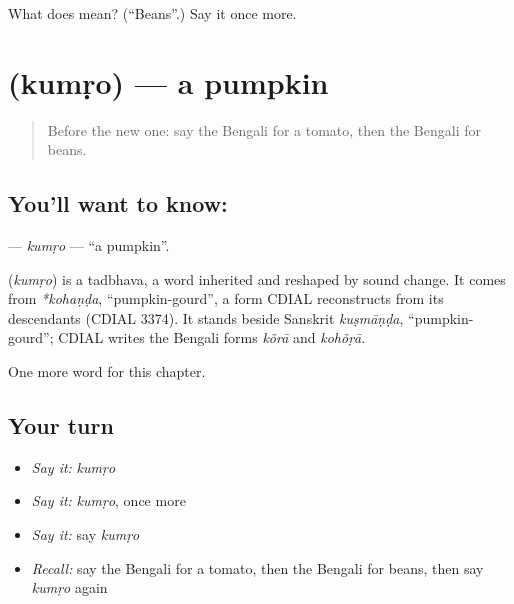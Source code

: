 \begin{tcolorbox}[breakable,colback=teal!4,colframe=teal!35!black,title={Before you move on}]
What does  mean? (\textquotedblleft{}Beans\textquotedblright{}.) Say it once more.
\end{tcolorbox}
\section[\texorpdfstring{\bn{কুমড়ো} (kumṛo)}{কুমড়ো (kumṛo)}]{ (kumṛo) — a pumpkin}

\label{lesson:BN-C117-kumro}



\begin{quote}
Before the new one: say the Bengali for a tomato, then the Bengali for beans.
\end{quote}

\subsection*{You'll want to know: }
\textbf{} — \emph{kumṛo} — \textquotedblleft{}a pumpkin\textquotedblright{}.

\begin{cousinweb}
\textbf{} (\emph{kumṛo}) is a tadbhava, a word inherited and reshaped by sound change. It comes from \emph{*kohaṇḍa}, \textquotedblleft{}pumpkin-gourd\textquotedblright{}, a form CDIAL reconstructs from its descendants (CDIAL 3374). It stands beside Sanskrit \emph{kuṣmāṇḍa}, \textquotedblleft{}pumpkin-gourd\textquotedblright{}; CDIAL writes the Bengali forms \emph{kõrā} and \emph{kohõṛā}.
\end{cousinweb}

\begin{grammarlens}[title={What you've built}]
One more word for this chapter.
\end{grammarlens}

\subsection*{Your turn}
\begin{itemize}
\raggedright
  \item \emph{Say it:} \emph{kumṛo}
  \item \emph{Say it:} \emph{kumṛo}, once more
  \item \emph{Say it:} say \emph{kumṛo}
  \item \emph{Recall:} say the Bengali for a tomato, then the Bengali for beans, then say \emph{kumṛo} again
\end{itemize}

